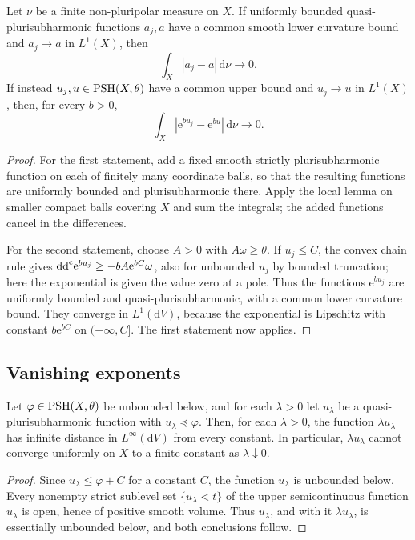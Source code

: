 \begin{lemma}\label{lem:fixed-npp-integrals}
Let $\nu$ be a finite non-pluripolar measure on $X$. If uniformly bounded quasi-plurisubharmonic functions $a_j,a$ have a common smooth lower curvature bound and $a_j\to a$ in $L^1(X)$, then
\[
 \int_X|a_j-a|\,\mathrm{d}\nu\longrightarrow0.
\]
If instead $u_j,u\in\mathrm{PSH}(X,\theta)$ have a common upper bound and $u_j\to u$ in $L^1(X)$, then, for every $b>0$,
\[
 \int_X|\mathrm{e}^{bu_j}-\mathrm{e}^{bu}|\,\mathrm{d}\nu\longrightarrow0.
\]
\end{lemma}
\begin{proof}
For the first statement, add a fixed smooth strictly plurisubharmonic function on each of finitely many coordinate balls, so that the resulting functions are uniformly bounded and plurisubharmonic there. Apply the local lemma on smaller compact balls covering $X$ and sum the integrals; the added functions cancel in the differences.

For the second statement, choose $A>0$ with $A\omega\geq\theta$. If $u_j\leq C$, the convex chain rule gives $\mathrm{dd}^{\mathrm{c}} \mathrm{e}^{bu_j}\geq-bA\mathrm{e}^{bC}\omega$, also for unbounded $u_j$ by bounded truncation; here the exponential is given the value zero at a pole. Thus the functions $\mathrm{e}^{bu_j}$ are uniformly bounded and quasi-plurisubharmonic, with a common lower curvature bound. They converge in $L^1(\mathrm{d}V)$, because the exponential is Lipschitz with constant $b\mathrm{e}^{bC}$ on $(-\infty,C]$. The first statement now applies.
\end{proof}

\subsection{Vanishing exponents}

\begin{proposition}\label{prop:singular-no-uniform-limit}
Let $\varphi\in\mathrm{PSH}(X,\theta)$ be unbounded below, and for each $\lambda>0$ let $u_\lambda$ be a quasi-plurisubharmonic function with $u_\lambda\preceq\varphi$. Then, for each $\lambda>0$, the function $\lambda u_\lambda$ has infinite distance in $L^\infty(\mathrm{d}V)$ from every constant. In particular, $\lambda u_\lambda$ cannot converge uniformly on $X$ to a finite constant as $\lambda\downarrow0$.
\end{proposition}
\begin{proof}
Since $u_\lambda\leq\varphi+C$ for a constant $C$, the function $u_\lambda$ is unbounded below. Every nonempty strict sublevel set $\{u_\lambda<t\}$ of the upper semicontinuous function $u_\lambda$ is open, hence of positive smooth volume. Thus $u_\lambda$, and with it $\lambda u_\lambda$, is essentially unbounded below, and both conclusions follow.
\end{proof}

